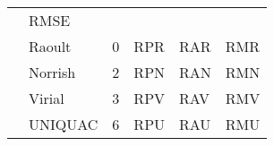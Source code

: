 \documentclass[border=1cm]{standalone}
\begin{document}
\begin{table}[!h]
\begin{tabular}{| l | l l l l l|}
		& RMSE \\                                                    %
		& Raoult & 0 & RPR & RAR & RMR \\                            %
		& Norrish & 2 & RPN & RAN & RMN \\                           %
		& Virial & 3 & RPV & RAV & RMV \\                            %
		& UNIQUAC & 6 & RPU & RAU & RMU \\\hline                     %
\end{tabular}                                                                %
\label{NAME}                                                                 %
\end{table}                                                                  %
\end{document}
